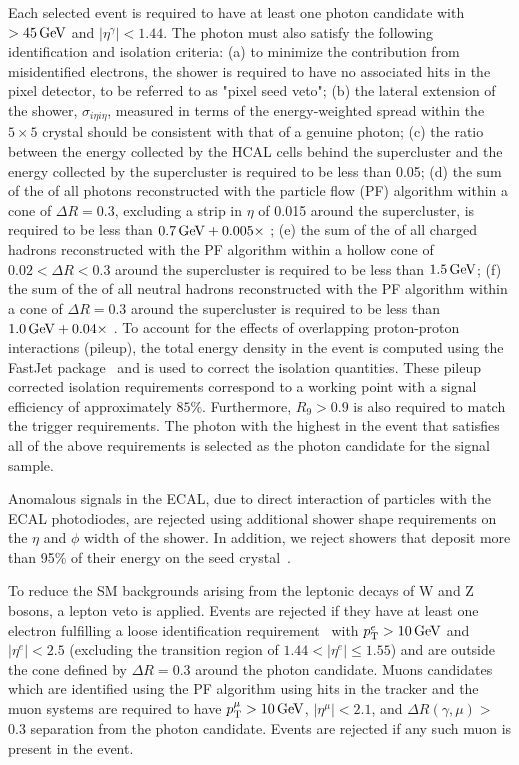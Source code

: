     Each selected event is required to have at least one photon candidate with  \etg\ $ > 45 \,\text{Ge\hspace{-.08em}V}$ and $|\eta^{\gamma}| < 1.44$.
		The photon must also satisfy the following identification and isolation criteria:
		(a) to minimize the contribution from misidentified electrons, the shower is required to have no associated hits in the pixel detector, to be referred to as "pixel seed veto";
		(b) the lateral extension of the shower, $\sigma_{i\eta i\eta}$, measured in terms of the energy-weighted spread within the $5\times 5$ crystal should be consistent with that of a genuine photon;
		(c) the ratio between the energy collected by the HCAL cells behind the supercluster and the energy collected by the supercluster is required to be less than 0.05;
		(d) the sum of the \et of all photons reconstructed with the particle flow (PF) algorithm within a cone of $\Delta R = 0.3$, excluding a strip in $\eta$ of 0.015 around the supercluster, is required to be less than $0.7 \,\text{Ge\hspace{-.08em}V} +0.005 \times$ \etg;
		(e) the sum of the \et of all charged hadrons reconstructed with the PF algorithm within a hollow cone of $0.02 < \Delta R < 0.3$ around the supercluster is required to be less than $1.5 \,\text{Ge\hspace{-.08em}V}$;
		(f) the sum of the \et of all neutral hadrons reconstructed with the PF algorithm within a cone of $\Delta R = 0.3$ around the supercluster is required to be less than $1.0 \,\text{Ge\hspace{-.08em}V} +0.04 \times$ \etg.
		To account for the effects of overlapping proton-proton interactions (pileup), the total energy density in the event is computed using the {\sc FastJet} package~\cite{Cacciari:2011ma} and is used to correct the isolation quantities.
		These pileup corrected isolation requirements correspond to a working point with a signal efficiency of approximately $85\%$. Furthermore, $R_{9} > 0.9$ is also required to match the trigger requirements.
		The photon with the highest \et in the event that satisfies all of the above requirements is selected as the photon candidate for the signal sample.

		Anomalous signals in the ECAL, due to direct interaction of particles with the ECAL photodiodes, are rejected using additional shower shape requirements on the $\eta$ and $\phi$ width of the shower. In addition, we reject showers that deposit more than 95\% of their energy on the seed crystal~\cite{spikecleaning}.  

        To reduce the SM backgrounds arising from the leptonic decays of W and Z bosons, a lepton veto is applied. Events are rejected if they have at least one electron fulfilling a loose identification requirement~\cite{ele_id} with $p_{\mathrm{T}}^{e} > 10\,\text{Ge\hspace{-.08em}V}$ and $|\eta^{e}| < 2.5$ (excluding the transition region of $1.44 < |\eta^{e}| \leq 1.55$) and are outside the cone defined by $\Delta R = 0.3$ around the photon candidate. Muons candidates which are identified using the PF algorithm using hits in the tracker and the muon systems are required to have $p_{\mathrm{T}}^{\mu} > 10\,\text{Ge\hspace{-.08em}V}$, $|\eta^{\mu}| < 2.1$, and $\Delta R(\gamma,\mu) > $0.3 separation from the photon candidate. Events are rejected if any such muon is present in the event.


